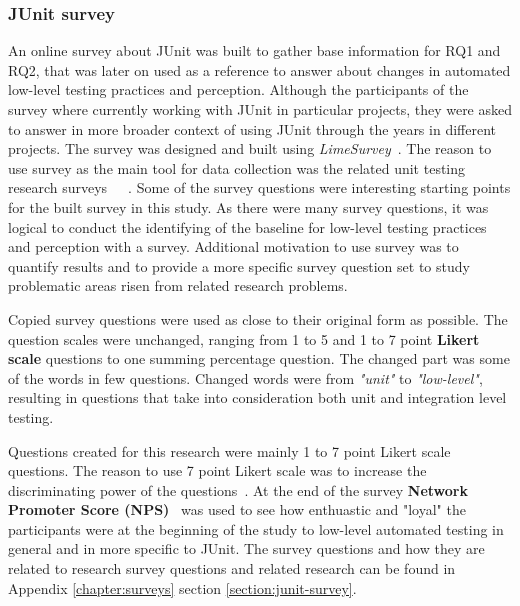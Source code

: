     \subsubsection{JUnit survey}
    An online survey about JUnit was built to gather base information for RQ1 and RQ2, that was
    later on used as a reference to answer about changes in automated low-level testing practices and perception. Although
    the participants of the survey where currently working with JUnit in particular projects, they were asked to answer
    in more broader context of using JUnit through the years in different projects.
    The survey was designed and built using \textit{LimeSurvey}~\cite{limesurvey}. The reason to use survey as the main tool for data collection
    was the related unit testing research surveys~\cite{williams2009effectiveness}~\cite{daka2014survey}~\cite{li2016automatically}.
    Some of the survey questions were interesting starting points
    for the built survey in this study. As there were many survey questions, it was logical to conduct the identifying
    of the baseline for low-level testing practices and perception with a survey. Additional motivation to use
    survey was to quantify results and to provide a more specific survey question set to study problematic
    areas risen from related research problems.

    Copied survey questions were used as close to their original form as possible.
    The question scales were unchanged, ranging from 1 to 5 and 1 to 7 point \textbf{Likert scale} questions
    to one summing percentage question. The changed part was some of the words in few questions.
    Changed words were from \textit{"unit"} to \textit{"low-level"},
    resulting in questions that take into consideration both unit and integration level testing.

    Questions created for this research were mainly 1 to 7 point Likert scale questions.
    The reason to use 7 point Likert scale was to increase the discriminating power of the questions~\cite{cummins2000we}.
    At the end of the survey \textbf{Network Promoter Score (NPS)}~\cite{reichheld2003one} was used to see how enthuastic and "loyal" the participants
    were at the beginning of the study to low-level automated testing in general and in more specific to JUnit.
    The survey questions and how they are related to research survey questions and related research can be found
    in Appendix \ref{chapter:surveys} section \ref{section:junit-survey}.

